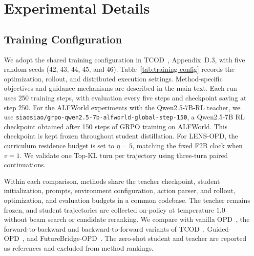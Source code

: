 \documentclass{article}
\begin{document}
\section{Experimental Details}
\label{app:experimental-details}

\subsection{Training Configuration}
We adopt the shared training configuration in TCOD~\citep{wang2026tcod}, Appendix~D.3,
with five random seeds (42, 43, 44, 45, and 46). Table~\ref{tab:training-config}
records the optimization, rollout, and distributed execution settings. Method-specific
objectives and guidance mechanisms are described in the main text. Each run uses 250
training steps, with evaluation every five steps and checkpoint saving at step 250.
For the ALFWorld experiments with the Qwen2.5-7B-RL teacher, we use
\nolinkurl{siaosiao/grpo-qwen2.5-7b-alfworld-global-step-150},
a Qwen2.5-7B RL checkpoint obtained after 150 steps of GRPO training on ALFWorld.
This checkpoint is kept frozen throughout student distillation. For LENS-OPD, the curriculum
residence budget is set to $\eta=5$, matching the fixed F2B clock when $v=1$. We validate one
Top-KL turn per trajectory using three-turn paired continuations.

Within each comparison, methods share the teacher checkpoint, student initialization, prompts,
environment configuration, action parser, and rollout, optimization, and evaluation budgets in a
common codebase. The teacher remains frozen, and student trajectories are collected on-policy at
temperature $1.0$ without beam search or candidate reranking. We compare with vanilla
OPD~\citep{agarwal2024policy}, the forward-to-backward and backward-to-forward variants of
TCOD~\citep{wang2026tcod}, Guided-OPD~\citep{li2026policy}, and
FutureBridge-OPD~\citep{chen2026look}. The zero-shot student and teacher are reported as references
and excluded from method rankings.
\end{document}
